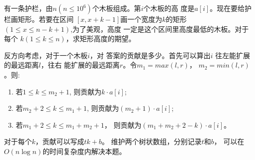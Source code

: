 \begin{prob}
	有一条护栏，由$n(n \le 10^6)$个木板组成。第$i$个木板的高
	度是$a[i]$。现在要给护栏画矩形。若要在区间
	$[x,x+k-1]$画一个宽度为$k$的矩形
	$(1\le x\le n-k+1)$,为了美观，高度
	一定是这个区间里高度最低的木板。对于每个
	$k(1 \le k \le n)$，求矩形高度的期望。
\end{prob}

\begin{sol}
	反方向考虑，对于一个木板$i$，对
	答案的贡献是多少。首先可以算出$i$
	往左能扩展的最远距离$l$，往右
	能扩展的最远距离$r$。令$m_1 = max(l, r)$，
	$m_2 = min(l, r)$。则:
	\begin{enumerate}
		\item 若$1 \le k \le m_2 + 1$,
			则贡献为$k \cdot a[i]$;
		\item 若$m_2+2 \le k \le m_1+1$,
			则贡献为$(m_2+1) \cdot a[i]$;
		\item 若$m_1+2 \le k \le m_1 + m_2 + 1$，
			则贡献为$(m_1+m_2+2-k) \cdot a[i]$。
	\end{enumerate}
	对于每个$k$，贡献可以写成$tk + b$。
	维护两个树状数组，分别记录$t$和$b$，
	可以在$O(n \log n)$的时间复杂度内解决本题。
\end{sol}
